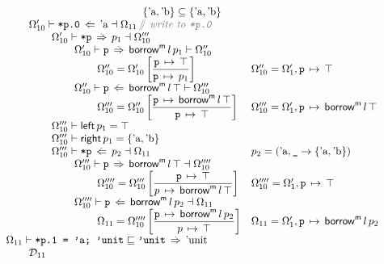 \documentclass[12pt,twoside]{report}
\begin{document}
{\[\begin{array}{ll}
    \otab \otab\otab\otab\otab\otab\otab \{\atom{a}, \atom{b}\} \subseteq \{\atom{a}, \atom{b}\} \\
    \otab \otab \Omega_{10}' \vdash \mono{*p.0} \writearrowabs \atom{a} \dashv \Omega_{11} \, \ocomment{write to \mono{*p.0}} \\
    \otab \otab\otab \Omega_{10}' \vdash \mono{*p} \movearrowabs p_1 \dashv \Omega_{10}''' \\
    \otab \otab\otab\otab \Omega_{10}' \vdash \mono{p} \movearrowabs \borrowm{l}{p_1} \vdash \Omega_{10}'' \\
    \otab \otab\otab\otab\otab \Omega_{10}'' = \Omega_{10}'\left[\dfrac{\absmapm{p}{\top}}{\absmapm{p}{p_1}}\right] &
      \Omega_{10}'' = \Omega_1',\absmapm{p}{\top} \\
    \otab \otab\otab\otab \Omega_{10}'' \vdash \mono{p} \writearrowabs \borrowm{l}{\top} \vdash \Omega_{10}''' \\
    \otab \otab\otab\otab\otab \Omega_{10}''' = \Omega_{10}''\left[\dfrac{\absmapm{p}{\borrowm{l}{\top}}}{\absmapm{p}{\top}}\right] &
      \Omega_{10}''' = \Omega_1',\absmapm{p}{\borrowm{l}{\top}} \\
    \otab \otab\otab \Omega_{10}''' \vdash \oleft{p_1} = \top \\
    \otab \otab\otab \Omega_{10}''' \vdash \oright{p_1} = \{\atom{a}, \atom{b}\} \\
    \otab \otab\otab \Omega_{10}''' \vdash \mono{*p} \writearrowabs p_2 \dashv \Omega_{11} &
      p_2 = (\atom{a}, \mono{\_} \rightarrow \{\atom{a}, \atom{b}\}) \\
    \otab \otab\otab\otab \Omega_{10}''' \vdash \mono{p} \movearrowabs \borrowm{l}{\top} \dashv \Omega_{10}'''' \\
    \otab \otab\otab\otab\otab \Omega_{10}'''' = \Omega_{10}'''\left[\dfrac{\absmapm{p}{\top}}{\absmap{p}{\borrowm{l}{\top}}}\right] &
      \Omega_{10}'''' = \Omega_1',\absmapm{p}{\top} \\
    \otab \otab\otab\otab \Omega_{10}'''' \vdash \mono{p} \writearrowabs \borrowm{l}{p_2} \dashv \Omega_{11} \\
    \otab \otab\otab\otab\otab \Omega_{11} = \Omega_{10}''''\left[\dfrac{\absmapm{p}{\borrowm{l}{p_2}}}{\absmap{p}{\top}}\right] &
      \Omega_{11} = \Omega_1', \absmapm{p}{\borrowm{l}{p_2}} \\
  
    \otab \Omega_{11} \vdash \mono{*p.1 = 'a; 'unit} \subtype \mono{'unit} \movearrowabs \atom{unit} \\
    \otab\otab \mathcal{D}_{11} \\
  \end{array}\]
    
}
\end{document}
